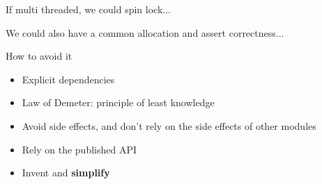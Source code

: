 \documentclass[xcolor=svgnames]{beamer}
\begin{document}


{%
%
\begin{frame}{\subsecname}
    \begin{minipage}{\columnwidth}
        If multi threaded, we could spin lock...
    \end{minipage}
\end{frame}
}



{%
%
\begin{frame}{\subsecname}
    \begin{minipage}{\columnwidth}
        We could also have a common allocation and assert correctness...
    \end{minipage}
\end{frame}
}



{%
%
\begin{frame}{\subsecname}

    How to avoid it
    \begin{itemize}
        \pause \item Explicit dependencies
        \pause \item Law of Demeter: principle of least knowledge
        \pause \item Avoid side effects, and don't rely on the side effects of
            other modules
        \pause \item Rely on the published API
        \pause \item Invent and \textbf{simplify}
    \end{itemize}
\end{frame}
}
\end{document}
